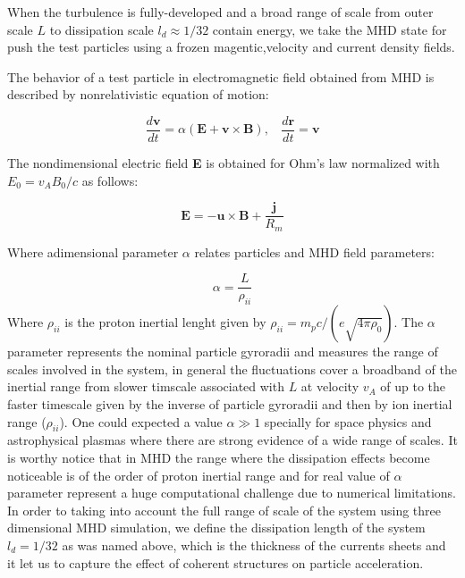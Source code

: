 \documentclass[11pt,twocolumn]{article}
\begin{document}
When the turbulence is fully-developed and a broad range of scale from outer scale $L$ to dissipation scale $l_d\approx 1/32$ contain energy, we take the MHD state for push the test particles using a frozen magentic,velocity and current density fields.

The behavior of a test particle in electromagnetic field obtained from MHD is described by nonrelativistic equation of motion:

\begin{equation}
  \frac{d\textbf{v}}{dt} = \alpha(\textbf{E} + \textbf{v} \times \textbf{B}), \ \ \ \  \frac{d\textbf{r}}{dt} = \textbf{v}
\end{equation}
 
The nondimensional electric field \textbf{E} is obtained for Ohm's law normalized with $E_0= v_A B_0/c$ as follows:

\begin{equation}
 \textbf{E} =  -\textbf{u}  \times \textbf{B} + \frac{\textbf{j}}{R_m} 
\end{equation}

Where adimensional parameter $\alpha$ relates particles and MHD field parameters:

\begin{equation}
\alpha=\frac{L}{\rho_{ii}}
\end{equation}
Where $\rho_{ii}$ is the proton inertial lenght given by $\rho_{ii}=m_pc/(e\sqrt{4\pi\rho_0})$. The $\alpha$ parameter represents the nominal particle gyroradii and measures the range of scales involved in the system, in general the fluctuations cover a broadband of the inertial range from slower timscale associated with $L$ at velocity $v_A$ of up to the faster timescale given by the inverse of particle gyroradii and then by ion inertial range ($\rho_{ii}$). One could expected a value $\alpha \gg 1$ specially for space physics and astrophysical plasmas where there are strong evidence of a wide range of scales. It is worthy notice that in MHD the range where the dissipation effects become noticeable is of the order of proton inertial range and for real value of $\alpha$ parameter represent a huge computational challenge due to numerical limitations. In order to taking into account the full range of scale of the system using three dimensional MHD simulation, we define the dissipation length of the system $l_d=1/32$ as was named above, which is the thickness of the currents sheets and it let us to capture the effect of coherent structures on particle acceleration.
\end{document}
